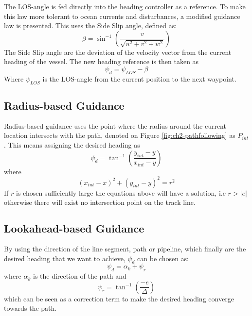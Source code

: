 		The LOS-angle is fed directly into the 
		heading controller as a reference. To make this law more tolerant to ocean currents 
		and disturbances, a modified guidance law is presented. This uses the Side Slip angle, defined as:
		\begin{equation}
			\label{eq:ch2-sideslip}
			\beta = \sin^{-1} ( \frac{v}{\sqrt{u^2 + v^2 + w^2}})
		\end{equation}
		The Side Slip angle are the deviation of the velocity vector from the current heading of the
		vessel.	The new heading reference is then taken as
		\begin{equation}
			\label{eq:ch2-los-law}
			\psi_d = \psi_{LOS} - \beta
		\end{equation}
		Where $\psi_{LOS}$ is the LOS-angle from the current position to the next waypoint. 

	\subsection{Radius-based Guidance}
		Radius-based guidance uses the point where the radius around the current location intersects
		with the path, denoted on Figure \ref{fig:ch2-pathfollowing} as $P_{int}$. This
		means assigning the desired heading as 
		\begin{equation}
			\psi_d = \tan^{-1}(\frac{y_{int} - y}{x_{int} - y})
		\end{equation}
		where 
		\begin{equation}
			(x_{int} - x)^2 + (y_{int} - y)^2 = r^2
		\end{equation}
		If $r$ is chosen sufficiently large the equations above will have a solution, i.e $r > |e|$
		otherwise there will exist no intersection point on the track line.
		\cite{guidance_planar_path}
	
	\subsection{Lookahead-based Guidance}
		By using the direction of the line segment, path or pipeline, which finally are the desired
		heading that we want to achieve, $\psi_d$ can be chosen as:
		\begin{equation}
			\psi_d = \alpha_k + \psi_r
		\end{equation}
		where $\alpha_k$ is the direction of the path and
		\begin{equation}
			\psi_r = \tan^{-1} (\frac{-e}{\Delta})
		\end{equation}
		which can be seen as a correction term to make the desired heading converge towards the path.

